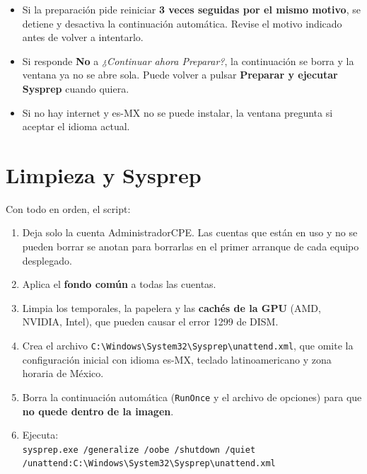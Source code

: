 \documentclass[11pt,a4paper]{report}
\newcommand{\bs}{\textbackslash\allowbreak{}}
\newcommand{\boton}[1]{\textsf{\textbf{#1}}}
\begin{document}
\begin{nota}
\begin{itemize}
  \item Si la preparación pide reiniciar \textbf{3 veces seguidas por el mismo
        motivo}, se detiene y desactiva la continuación automática. Revise el
        motivo indicado antes de volver a intentarlo.
  \item Si responde \boton{No} a \emph{¿Continuar ahora Preparar?}, la
        continuación se borra y la ventana ya no se abre sola. Puede volver a
        pulsar \boton{Preparar y ejecutar Sysprep} cuando quiera.
  \item Si no hay internet y es-MX no se puede instalar, la ventana pregunta
        si aceptar el idioma actual.
\end{itemize}
\end{nota}

\section{Limpieza y Sysprep}\label{sec:sysprep}

Con todo en orden, el script:

\begin{enumerate}
  \item Deja solo la cuenta AdministradorCPE. Las cuentas que están en uso y
        no se pueden borrar se anotan para borrarlas en el primer arranque de
        cada equipo desplegado.
  \item Aplica el \textbf{fondo común} a todas las cuentas.
  \item Limpia los temporales, la papelera y las \textbf{cachés de la GPU}
        (AMD, NVIDIA, Intel), que pueden causar el error 1299 de DISM.
  \item Crea el archivo \texttt{C:\bs Windows\bs System32\bs Sysprep\bs unattend.xml},
        que omite la configuración inicial con idioma es-MX, teclado
        latinoamericano y zona horaria de México.
  \item Borra la continuación automática (\texttt{RunOnce} y el archivo de
        opciones) para que \textbf{no quede dentro de la imagen}.
  \item Ejecuta:\\[2pt]
        \texttt{\small sysprep.exe /generalize /oobe /shutdown /quiet}\\
        \texttt{\small\hspace*{2em}/unattend:C:\bs Windows\bs System32\bs Sysprep\bs unattend.xml}
\end{enumerate}
\end{document}
